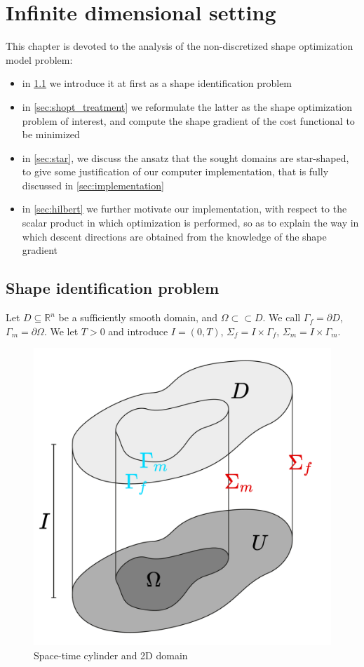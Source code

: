 \documentclass[english,a4paper,9pt,oneside]{scrbook}	%
\theoremstyle{break}
\theoremstyle{remark}
\newcommand{\mR}{\mathbb{R}}
\newcommand{\cc}{\subset\subset}
\begin{document}
\chapter{Infinite dimensional setting}
\label{chap:cts_shape_opt}

This chapter is devoted to the analysis of the non-discretized shape optimization model problem:

\begin{itemize}
	\item in \cref{sec:shid} we introduce it at first as a shape identification problem
	\item in \cref{sec:shopt_treatment} we reformulate the latter as the shape optimization problem of interest, and compute the shape gradient of the cost functional to be minimized
	\item in \cref{sec:star}, we discuss the ansatz that the sought domains are star-shaped, to give some justification of our computer implementation, that is fully discussed in \cref{sec:implementation}
	\item in \cref{sec:hilbert} we further motivate our implementation, with respect to the scalar product in which optimization is performed, so as to explain the way in which descent directions are obtained from the knowledge of the shape gradient
\end{itemize}

\section{Shape identification problem}
\label{sec:shid}

Let $D\subseteq\mR^n$ be a sufficiently smooth domain, and $\Omega \cc D$. We call $\Gamma_f=\partial D$, $\Gamma_m = \partial \Omega$. We let $T>0$ and introduce $I = (0,T)$, $\Sigma_f=I\times \Gamma_f$, $\Sigma_m=I\times \Gamma_m$.

\begin{figure}[H]
\centering
\includegraphics[height=0.25\columnwidth]{Images/Domains.pdf}
\caption{Space-time cylinder and 2D domain}\label{fig:space_time}
\end{figure}
\end{document}
